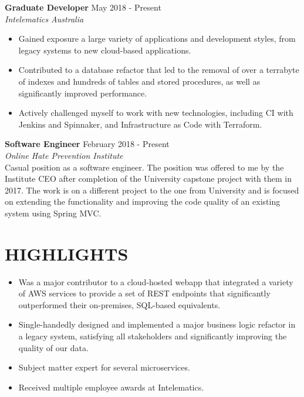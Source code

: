 \documentclass[margin, 11pt]{res} %
\begin{document}
\begin{resume}
\textbf{Graduate Developer} \hfill May 2018 - Present \\
{\sl Intelematics Australia} \\
\begin{itemize}

\item Gained exposure a large variety of applications and development styles, from legacy systems to new cloud-based applications.
\item Contributed to a database refactor that led to the removal of over a terrabyte of indexes and hundreds of tables and stored procedures, as well as significantly improved performance.
\item Actively challenged myself to work with new technologies, including CI with Jenkins and Spinnaker, and Infrastructure as Code with Terraform.

\end{itemize} 

\textbf{Software Engineer} \hfill February 2018 - Present \\
{\sl Online Hate Prevention Institute} \\
Casual position as a software engineer. The position was offered to me by the Institute CEO after completion of the University capstone project with them in 2017. The work is on a different project to the one from University and is focused on extending the functionality and improving the code quality of an existing system using Spring MVC.


\section{HIGHLIGHTS} 

\begin{itemize}

\item Was a major contributor to a cloud-hosted webapp that integrated a variety of AWS services to provide a set of REST endpoints that significantly outperformed their on-premises, SQL-based equivalents.
\item Single-handedly designed and implemented a major business logic refactor in a legacy system, satisfying all stakeholders and significantly improving the quality of our data. 
\item Subject matter expert for several microservices.
\item Received multiple employee awards at Intelematics.



\end{itemize}
\end{resume}
\end{document}
